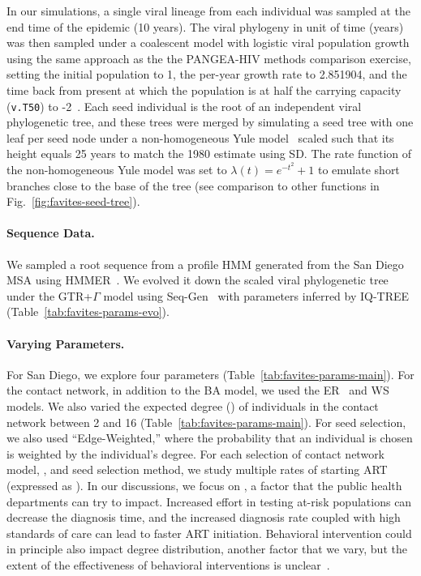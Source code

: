 In our simulations, a single viral lineage from each individual was sampled at the end time of the epidemic (10 years). The viral phylogeny in unit of time (years) was then sampled under a coalescent model with logistic viral population growth using the same approach as the the PANGEA-HIV methods comparison exercise, setting the initial population to 1, the per-year growth rate to 2.851904, and the time back from present at which the population is at half the carrying capacity (\texttt{v.T50}) to -2~\cite{Ratmann2017}. Each seed individual is the root of an independent viral phylogenetic tree, and these trees were merged by simulating a seed tree with one leaf per seed node under a non-homogeneous Yule model~\cite{LeGat2016} scaled such that its height equals 25 years to match the 1980 estimate using SD. The rate function of the non-homogeneous Yule model was set to $\lambda(t)=e^{-t^2}+1$ to emulate short branches close to the base of the tree (see comparison to other functions in Fig.~\ref{fig:favites-seed-tree}).

\paragraph{Sequence Data.} We sampled a root sequence from a profile \gls{HMM} generated from the San Diego \gls{MSA} using HMMER~\cite{Eddy1998}. We evolved it down the scaled viral phylogenetic tree under the \gls{GTR}+$\Gamma$ model using Seq-Gen~\cite{Rambaut1997} with parameters inferred by IQ-TREE (Table~\ref{tab:favites-params-evo}).

\paragraph{Varying Parameters.} For San Diego, we explore four parameters (Table~\ref{tab:favites-params-main}). For the contact network, in addition to the \gls{BA} model, we used the \gls{ER}~\cite{Erdos1960} and \gls{WS}~\cite{Watts1998} models. We also varied the expected degree (\ED) of individuals in the contact network between 2 and 16 (Table~\ref{tab:favites-params-main}). For seed selection, we also used ``Edge-Weighted,'' where the probability that an individual is chosen is weighted by the individual's degree. For each selection of contact network model, \ED, and seed selection method, we study multiple rates of starting ART (expressed as \EART). In our discussions, we focus on \EART, a factor that the public health departments can try to impact. Increased effort in testing at-risk populations can decrease the diagnosis time, and the increased diagnosis rate coupled with high standards of care can lead to faster ART initiation. Behavioral intervention could in principle also impact degree distribution, another factor that we vary, but the extent of the effectiveness of behavioral interventions is unclear~\cite{Kelly1991}.

